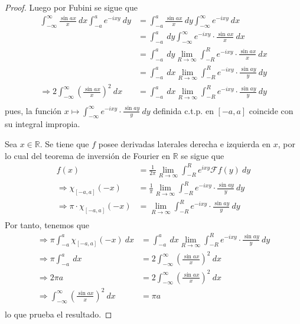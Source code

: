 \documentclass[12pt]{report}
\theoremstyle{largebreak}
\newcommand{\fou}[1]{\ensuremath{\mathcal{F}#1}}
\begin{document}
\begin{proof}
        Luego por Fubini se sigue que
        \begin{equation*}
            \begin{split}
                \int_{-\infty}^{\infty}\frac{\sin ax}{x}\:dx\int_{-a}^a e^{ -ixy}\:dy&=\int_{-a}^{a}\frac{\sin ax}{x}\:dy\int_{-\infty}^\infty e^{ -ixy}\:dx\\
                &=\int_{-a}^{a}\:dy\int_{-\infty}^\infty e^{ -ixy}\cdot\frac{\sin ax}{x}\:dx\\
                &=\int_{-a}^{a}\:dy \lim_{ R\rightarrow\infty}\int_{-R}^R e^{ -ixy}\cdot\frac{\sin ax}{x}\:dx\\
                &=\int_{-a}^{a}\:dx \lim_{ R\rightarrow\infty}\int_{-R}^R e^{ -ixy}\cdot\frac{\sin ay}{y}\:dy\\
                \Rightarrow 2\int_{-\infty}^{\infty}\left(\frac{\sin ax}{x}\right)^2\:dx&=\int_{-a}^{a}\:dx \lim_{ R\rightarrow\infty}\int_{-R}^R e^{ -ixy}\cdot\frac{\sin ay}{y}\:dy\\
            \end{split}
        \end{equation*}
        pues, la función $x\mapsto \int_{-\infty}^\infty e^{ -ixy}\cdot\frac{\sin ay}{y}\:dy$ definida c.t.p. en $[-a,a]$ coincide con su integral impropia. 

        Sea $x\in\mathbb{R}$. Se tiene que $f$ posee derivadas laterales derecha e izquierda en $x$, por lo cual del teorema de inversión de Fourier en $\mathbb{R}$ se sigue que
        \begin{equation*}
            \begin{split}
                f(x)&=\frac{1}{2\pi}\lim_{ R\rightarrow\infty}\int_{-R}^R e^{ ixy}\fou{f}(y)\:dy\\
                \Rightarrow\chi_{[-a,a]}(-x)&=\frac{1}{\pi}\lim_{ R\rightarrow\infty}\int_{-R}^R e^{-ixy}\cdot\frac{\sin ay}{y} \:dy\\
                \Rightarrow\pi\cdot\chi_{[-a,a]}(-x)&=\lim_{ R\rightarrow\infty}\int_{-R}^R e^{-ixy}\cdot\frac{\sin ay}{y} \:dy\\
            \end{split}
        \end{equation*}
        Por tanto, tenemos que
        \begin{equation*}
            \begin{split}
                \Rightarrow \pi\int_{-a}^a\chi_{[-a,a]}(-x)\:dx&=\int_{-a}^a\:dx \lim_{ R\rightarrow\infty}\int_{-R}^R e^{-ixy}\cdot\frac{\sin ay}{y} \:dy\\
                \Rightarrow \pi\int_{-a}^a\:dx&=2\int_{-\infty}^{\infty}\left(\frac{\sin ax}{x}\right)^2\:dx\\
                \Rightarrow 2\pi a&=2\int_{-\infty}^{\infty}\left(\frac{\sin ax}{x}\right)^2\:dx\\
                \Rightarrow \int_{-\infty}^{\infty}\left(\frac{\sin ax}{x}\right)^2\:dx&=\pi a\\
            \end{split}
        \end{equation*}
        lo que prueba el resultado.
    \end{proof}
\end{document}

